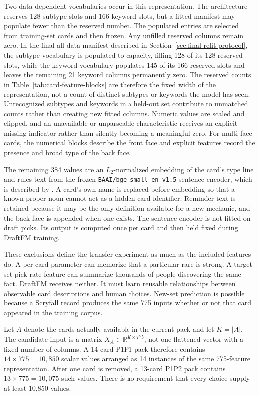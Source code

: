 \documentclass[11pt]{article}
\numberwithin{equation}{section}
\begin{document}
Two data-dependent vocabularies occur in this representation. The architecture
reserves 128 subtype slots and 166 keyword slots, but a fitted manifest may
populate fewer than the reserved number. The populated entries are selected
from training-set cards and then frozen. Any unfilled reserved columns remain
zero. In the final all-data manifest described in
Section~\ref{sec:final-refit-protocol}, the subtype vocabulary is populated to
capacity, filling 128 of its 128 reserved slots, while the keyword vocabulary
populates 145 of its 166 reserved slots and leaves the remaining 21 keyword
columns permanently zero. The reserved counts in
Table~\ref{tab:card-feature-blocks} are therefore the fixed width of the
representation, not a count of distinct subtypes or keywords the model has seen.
Unrecognized subtypes and keywords in a held-out set contribute to
unmatched counts rather than creating new fitted columns. Numeric values are
scaled and clipped, and an unavailable or unparseable characteristic receives
an explicit missing indicator rather than silently becoming a meaningful zero.
For multi-face cards, the numerical blocks describe the front face and explicit
features record the presence and broad type of the back face.

The remaining 384 values are an $L_2$-normalized embedding of the card's type
line and rules text from the frozen \texttt{BAAI/bge-small-en-v1.5} sentence
encoder, which is described by \citet{xiao2023}. A card's own name is replaced before
embedding so that a known proper noun cannot act as a hidden card identifier.
Reminder text is retained because it may be the only definition available for
a new mechanic, and the back face is appended when one exists. The sentence
encoder is not fitted on draft picks. Its output is computed once per card and
then held fixed during DraftFM training.

These exclusions define the transfer experiment as much as the included
features do. A per-card parameter can memorize that a particular rare is
strong. A target-set pick-rate feature can summarize thousands of people
discovering the same fact. DraftFM receives neither. It must learn reusable
relationships between observable card descriptions and human choices. New-set
prediction is possible because a Scryfall record produces the same 775 inputs
whether or not that card appeared in the training corpus.

Let $A$ denote the cards actually available in the current pack and let
$K=|A|$. The candidate input is a matrix $X_A\in\mathbb{R}^{K\times775}$, not
one flattened vector with a fixed number of columns. A 14-card P1P1 pack
therefore contains $14\times775=10{,}850$ scalar values arranged as 14
instances of the same 775-feature representation. After one card is removed,
a 13-card P1P2 pack contains $13\times775=10{,}075$ such values. There is no
requirement that every choice supply at least 10,850 values.
\end{document}
